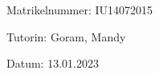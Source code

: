 \begin{large} 
\begin{center}
Matrikelnummer: IU14072015
\end{center}
\end{large} 

\vspace*{-6mm}

\begin{large} 
\begin{center}
Tutorin: Goram, Mandy
\end{center}
\end{large} 

\vspace*{-6mm}

\begin{large} 
\begin{center}
Datum: 13.01.2023
\end{center}
\end{large} 


\pagestyle{empty} %

